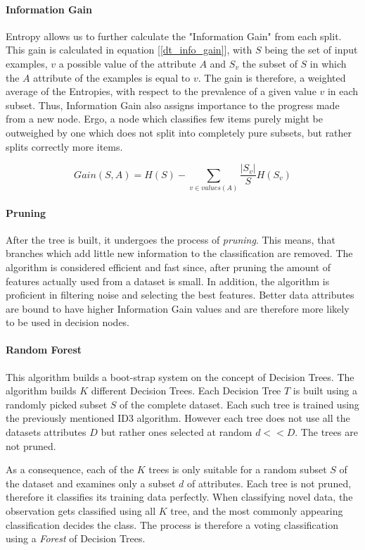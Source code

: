 	 \paragraph{Information Gain}	
	 	Entropy allows us to further calculate the "Information Gain" from each split. This gain is calculated in equation [\ref{dt_info_gain}], with $ S $ being the set of input examples, $ v $ a possible value of the attribute $ A $ and $ S_v $ the subset of $ S $ in which the $ A $ attribute of the examples is equal to $ v $. The gain is therefore, a weighted average of the Entropies, with respect to the prevalence of a given value $ v $ in each subset. Thus, Information Gain also assigns importance to the progress made from a new node. Ergo, a node which classifies few items purely might be outweighed by one which does not split into completely pure subsets, but rather splits correctly more items.
	 
			\begin{equation}
			Gain(S,A) = H(S) - \sum_{v \in values(A) } \frac{|S_v|}{S} H(S_v)
			\label{dt_info_gain}
	 \end{equation}
	 
	 \paragraph{Pruning}
		 After the tree is built, it undergoes the process of \textit{pruning}. This means, that branches which add little new information to the classification are removed. The algorithm is considered efficient and fast since, after pruning the amount of features actually used from a dataset is small. In addition, the algorithm is proficient in filtering noise and selecting the best features. Better data attributes are bound to have higher Information Gain values and are therefore more likely to be used in decision nodes.
	
	\paragraph{Random Forest}
		This algorithm builds a boot-strap system on the concept of Decision Trees. The algorithm \cite{breiman1984classification} builds $ K $ different Decision Trees. Each Decision Tree $ T $ is built using a randomly picked subset $ S $ of the complete dataset. Each such tree is trained using the previously mentioned ID3 algorithm. However each tree does not use all the datasets attributes $ D $ but rather ones selected at random $ d << D $. The trees are not pruned. 
		
		\par
		As a consequence, each of the $ K $ trees is only suitable for a random subset $ S $ of the dataset and examines only a subset $ d $ of attributes. Each tree is not pruned, therefore it classifies its training data perfectly. When classifying novel data, the observation gets classified using all $ K $ tree, and the most commonly appearing classification decides the class. The process is therefore a voting classification using a \textit{Forest} of Decision Trees.
 
	
	
